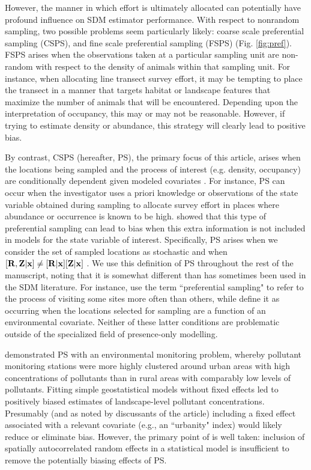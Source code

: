 \documentclass[times,mee,doublespace,]{besauth2}
\begin{document}
However, the manner in which effort is ultimately allocated can potentially have profound influence on SDM estimator performance.  With respect to nonrandom sampling, two possible problems seem particularly likely: coarse scale preferential sampling (CSPS), and fine scale preferential sampling (FSPS) (Fig. \ref{fig:pref}).  FSPS arises when the observations taken at a  particular sampling unit are non-random with respect to the density of animals within that sampling unit.  For instance, when allocating line transect survey effort, it may be tempting to place the transect in a manner that targets habitat or landscape features that maximize the number of animals that will be encountered.  Depending upon the interpretation of occupancy, this may or may not be reasonable.  However, if trying to estimate density or abundance, this strategy will clearly lead to positive bias.

By contrast, CSPS (hereafter, PS), the primary focus of this article, arises when the locations being sampled and the process of interest (e.g. density, occupancy) are conditionally dependent given modeled covariates \citep{DiggleEtAl2010}.  For instance, PS can occur when the investigator uses a priori knowledge or observations of the state variable obtained during sampling to allocate survey effort in places where abundance or occurrence is known to be high. \citet{DiggleEtAl2010} showed that this type of preferential sampling can lead to bias when this extra information is not included in models for the state variable of interest.  Specifically, PS arises when we consider the set of sampled locations as stochastic and when $[{\bf R},{\bf Z} | {\bf x}] \neq [{\bf R}|{\bf x}][{\bf Z}|{\bf x}]$ \citep{DiggleEtAl2010}.  We use this definition of PS throughout the rest of the manuscript, noting that it is somewhat different than has sometimes been used in the SDM literature.  For instance, \citet{MerckxEtAl2011} use the term ``preferential sampling" to refer to the process of visiting some sites more often than others, while \citet{ManceurKuhn2014} define it as occurring when the locations selected for sampling are a function of an environmental covariate.  Neither of these latter conditions are problematic outside of the specialized field of presence-only modelling.

\citet{DiggleEtAl2010} demonstrated PS with an environmental monitoring problem, whereby pollutant monitoring stations were more highly clustered around urban areas with high concentrations of pollutants than in rural areas with comparably low levels of pollutants.  Fitting simple geostatistical models without fixed effects led to positively biased estimates of landscape-level pollutant concentrations.  Presumably (and as noted by discussants of the article) including a fixed effect associated with a relevant covariate (e.g., an ``urbanity" index) would likely reduce or eliminate bias.  However, the primary point of \citet{DiggleEtAl2010} is well taken: inclusion of spatially autocorrelated random effects in a statistical model is insufficient to remove the potentially biasing effects of PS.
\end{document}
